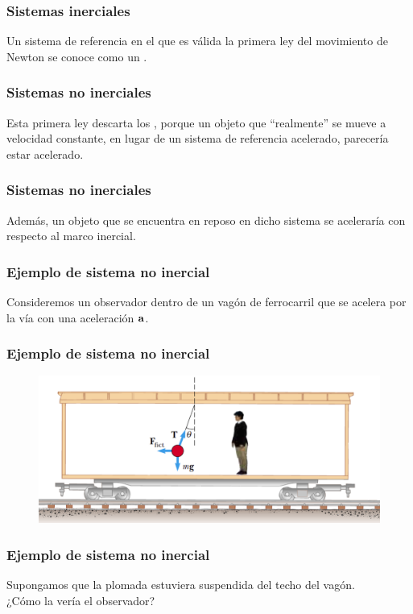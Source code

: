\documentclass[12pt]{beamer}
\begin{document}
\begin{frame}
\frametitle{Sistemas inerciales}
Un sistema de referencia en el que es válida la primera ley del movimiento de Newton se conoce como un .
\end{frame}
\begin{frame}
\frametitle{Sistemas no inerciales}
Esta primera ley descarta los , \pause porque un objeto que \enquote{realmente} se mueve a velocidad constante, en lugar de un sistema de referencia acelerado, parecería estar acelerado.
\end{frame}
\begin{frame}
\frametitle{Sistemas no inerciales}
Además, un objeto que se encuentra en reposo en dicho sistema se aceleraría con respecto al marco inercial. %
\end{frame}
\begin{frame}
\frametitle{Ejemplo de sistema no inercial}
Consideremos un observador dentro de un vagón de ferrocarril que se acelera por la vía con una aceleración $\vb{a}$.
\end{frame}
\begin{frame}
\frametitle{Ejemplo de sistema no inercial}
\begin{figure}
  \centering
  \includegraphics[scale=0.2]{Imagenes/Sistema_No_Inercial_01.png}
\end{figure}
\end{frame}
\begin{frame}
\frametitle{Ejemplo de sistema no inercial}
Supongamos que la plomada estuviera suspendida del techo del vagón.
\\
\bigskip
\pause
¿Cómo la vería el observador?
\end{frame}
\end{document}
